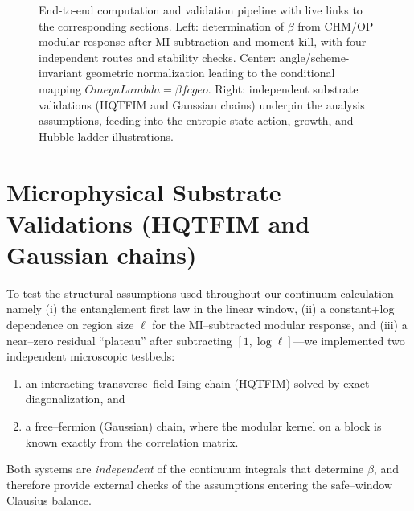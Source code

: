 \documentclass[aps,prd,onecolumn,superscriptaddress,nofootinbib]{revtex4-2}
\def\OmL{OmegaLambda}%
\def\cgeo{cgeo}%
\newcommand{\OmL}{\Omega_\Lambda}
\newcommand{\cgeo}{c_{\rm geo}}
\begin{document}
\begin{figure*}[t]
\caption{End-to-end computation and validation pipeline with live links to the corresponding sections. Left: determination of $\beta$ from CHM/OP modular response after MI subtraction and moment-kill, with four independent routes and stability checks. Center: angle/scheme-invariant geometric normalization leading to the conditional mapping $\OmL=\beta f\cgeo$. Right: independent substrate validations (HQTFIM and Gaussian chains) underpin the analysis assumptions, feeding into the entropic state-action, growth, and Hubble-ladder illustrations.}
\label{fig:pipeline}
\end{figure*}

\section{Microphysical Substrate Validations (HQTFIM and Gaussian chains)}
\label{sec:substrate-validations}
To test the structural assumptions used throughout our continuum calculation—namely (i) the entanglement first law in the linear window, (ii) a constant+log dependence on region size $\ell$ for the MI–subtracted modular response, and (iii) a near–zero residual ``plateau'' after subtracting $[1,\log\ell]$—we implemented two independent microscopic testbeds:
\begin{enumerate}[leftmargin=1.3em,label=(\alph*)]
\item an interacting transverse–field Ising chain (HQTFIM) solved by exact diagonalization, and
\item a free–fermion (Gaussian) chain, where the modular kernel on a block is known exactly from the correlation matrix.
\end{enumerate}
Both systems are \emph{independent} of the continuum integrals that determine $\beta$, and therefore provide external checks of the assumptions entering the safe–window Clausius balance.
\end{document}
